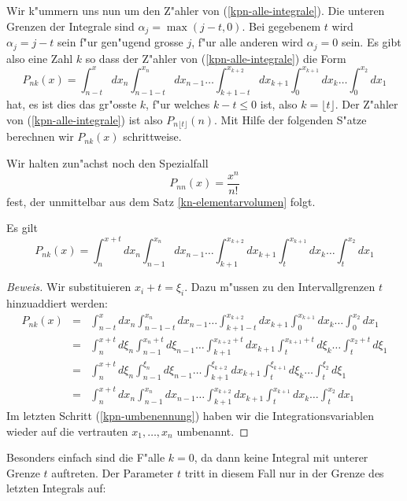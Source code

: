 Wir k"ummern uns nun um den Z"ahler von (\ref{kpn-alle-integrale}).
Die unteren Grenzen der
Integrale sind $\alpha_j=\max(j-t,0)$. Bei gegebenem $t$ wird $\alpha_j=j-t$
sein f"ur gen"ugend grosse $j$, f"ur alle anderen wird $\alpha_j=0$ sein.
Es gibt also eine Zahl $k$ so dass der Z"ahler von (\ref{kpn-alle-integrale})
die Form
\[
P_{nk}(x)
=
\int_{n-t}^xdx_n\int_{n-1-t}^{x_n}dx_{n-1}\dots\int_{k+1-t}^{x_{k+2}}dx_{k+1}\int_0^{x_{k+1}}dx_k\dots\int_0^{x_2}dx_1
\]
hat, es ist dies das gr"osste $k$, f"ur welches $k-t\le 0$ ist, also
$k=\lfloor t\rfloor$. Der Z"ahler von (\ref{kpn-alle-integrale})
ist also $P_{n\lfloor t\rfloor}(n)$.
Mit Hilfe der folgenden S"atze berechnen wir $P_{nk}(x)$ schrittweise.

Wir halten zun"achst noch den Spezialfall
\begin{equation}
P_{nn}(x)=\frac{x^n}{n!}
\label{spezialfall-pnn}
\end{equation}
fest, der unmittelbar aus dem Satz \ref{kn-elementarvolumen} folgt.

\begin{satz}
\label{kn-variablentransformation}
Es gilt
\begin{equation}
P_{nk}(x)=\int_{n}^{x+t}dx_n\int_{n-1}^{x_n}dx_{n-1}\dots\int_{k+1}^{x_{k+2}}dx_{k+1}\int_t^{x_{k+1}}dx_k\dots\int_t^{x_2}dx_1
\label{kpn-variablen-transformation}
\end{equation}
\end{satz}
\begin{proof}[Beweis]
Wir substituieren $x_i+t=\xi_i$. Dazu m"ussen zu den Intervallgrenzen
$t$ hinzuaddiert werden:
\begin{eqnarray}
P_{nk}(x)
&=&\int_{n-t}^xdx_n\int_{n-1-t}^{x_n}dx_{n-1}\dots\int_{k+1-t}^{x_{k+2}}dx_{k+1}\int_0^{x_{k+1}}dx_k\dots\int_0^{x_2}dx_1\nonumber\\
&=&\int_{n}^{x+t}d\xi_n\int_{n-1}^{x_n+t}d\xi_{n-1}\dots\int_{k+1}^{x_{k+2}+t}dx_{k+1}\int_t^{x_{k+1}+t}d\xi_k\dots\int_t^{x_2+t}d\xi_1\nonumber\\
&=&\int_{n}^{x+t}d\xi_n\int_{n-1}^{\xi_n}d\xi_{n-1}\dots\int_{k+1}^{\xi_{k+2}}dx_{k+1}\int_t^{\xi_{k+1}}d\xi_k\dots\int_t^{\xi_2}d\xi_1\nonumber\\
&=&\int_{n}^{x+t}dx_n\int_{n-1}^{x_n}dx_{n-1}\dots\int_{k+1}^{x_{k+2}}dx_{k+1}\int_t^{x_{k+1}}dx_k\dots\int_t^{x_2}dx_1 \label{kpn-umbenennung}
\end{eqnarray}
Im letzten Schritt (\ref{kpn-umbenennung}) haben wir die Integrationsvariablen
wieder auf die vertrauten $x_1,\dots,x_n$ umbenannt.
\end{proof}
Besonders einfach sind die F"alle $k=0$, da dann keine Integral mit
unterer Grenze $t$ auftreten. Der Parameter $t$ tritt in diesem Fall nur
in der Grenze des letzten Integrals auf:

